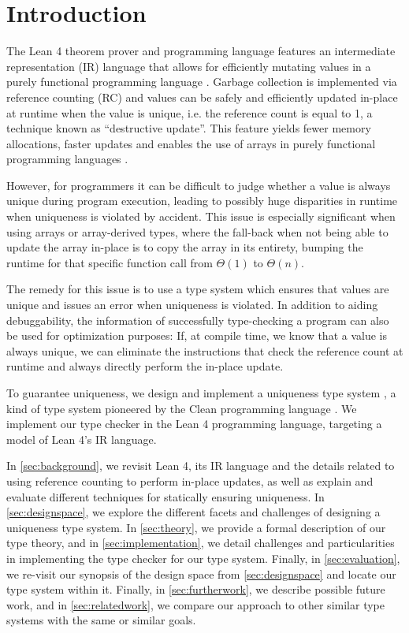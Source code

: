\chapter{Introduction}\label{sec:intro}

The Lean 4 theorem prover and programming language \citep{de_moura_lean_2021} features an intermediate representation (IR) language that allows for efficiently mutating values in a purely functional programming language \citep{ullrich_counting_2020}. Garbage collection is implemented via reference counting (RC) and values can be safely and efficiently updated in-place at runtime when the value is unique, i.e. the reference count is equal to 1, a technique known as ``destructive update''. This feature yields fewer memory allocations, faster updates and enables the use of arrays in purely functional programming languages \citep{ullrich_counting_2020}.

However, for programmers it can be difficult to judge whether a value is always unique during program execution, leading to possibly huge disparities in runtime when uniqueness is violated by accident. This issue is especially significant when using arrays or array-derived types, where the fall-back when not being able to update the array in-place is to copy the array in its entirety, bumping the runtime for that specific function call from $\Theta(1)$ to $\Theta(n)$.

The remedy for this issue is to use a type system which ensures that values are unique and issues an error when uniqueness is violated. In addition to aiding debuggability, the information of successfully type-checking a program can also be used for optimization purposes: If, at compile time, we know that a value is always unique, we can eliminate the instructions that check the reference count at runtime and always directly perform the in-place update.

To guarantee uniqueness, we design and implement a uniqueness type system \citep{sergey_linearity_2022}, a kind of type system pioneered by the Clean programming language \citep{smetsers_guaranteeing_1994}. We implement our type checker in the Lean 4 programming language, targeting a model of Lean 4's IR language.

In \cref{sec:background}, we revisit Lean 4, its IR language and the details related to using reference counting to perform in-place updates, as well as explain and evaluate different techniques for statically ensuring uniqueness. In \cref{sec:designspace}, we explore the different facets and challenges of designing a uniqueness type system. In \cref{sec:theory}, we provide a formal description of our type theory, and in \cref{sec:implementation}, we detail challenges and particularities in implementing the type checker for our type system. Finally, in \cref{sec:evaluation}, we re-visit our synopsis of the design space from \cref{sec:designspace} and locate our type system within it. Finally, in \cref{sec:furtherwork}, we describe possible future work, and in \cref{sec:relatedwork}, we compare our approach to other similar type systems with the same or similar goals.